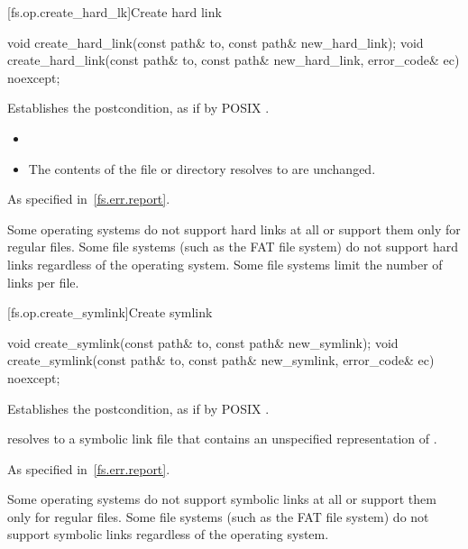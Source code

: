 [fs.op.create_hard_lk]{Create hard link}

%
\begin{itemdecl}
void create_hard_link(const path& to, const path& new_hard_link);
void create_hard_link(const path& to, const path& new_hard_link,
                                      error_code& ec) noexcept;
\end{itemdecl}

\begin{itemdescr}
\pnum
\effects Establishes the postcondition, as if by POSIX .

\pnum
\ensures
\begin{itemize}
\item {}
\item The contents of the file or directory
     resolves to are unchanged.
\end{itemize}

\pnum
\throws As specified in~\ref{fs.err.report}.

\pnum
\begin{note} Some operating systems do not support hard links at all or support
  them only for regular files. Some file systems (such as the FAT file system)
  do not support hard links regardless of the operating system.
  Some file systems limit the number of links per file. \end{note}
\end{itemdescr}

[fs.op.create_symlink]{Create symlink}

%
\begin{itemdecl}
void create_symlink(const path& to, const path& new_symlink);
void create_symlink(const path& to, const path& new_symlink,
                    error_code& ec) noexcept;
\end{itemdecl}

\begin{itemdescr}
\pnum
\effects Establishes the postcondition, as if by POSIX .

\pnum
\ensures {} resolves to a symbolic link file that
  contains an unspecified representation of .

\pnum
\throws As specified in~\ref{fs.err.report}.

\pnum
\begin{note} Some operating systems do not support symbolic links at all or support
  them only for regular files.
  Some file systems (such as the FAT file system) do not
  support symbolic links regardless of the operating system. \end{note}
\end{itemdescr}

